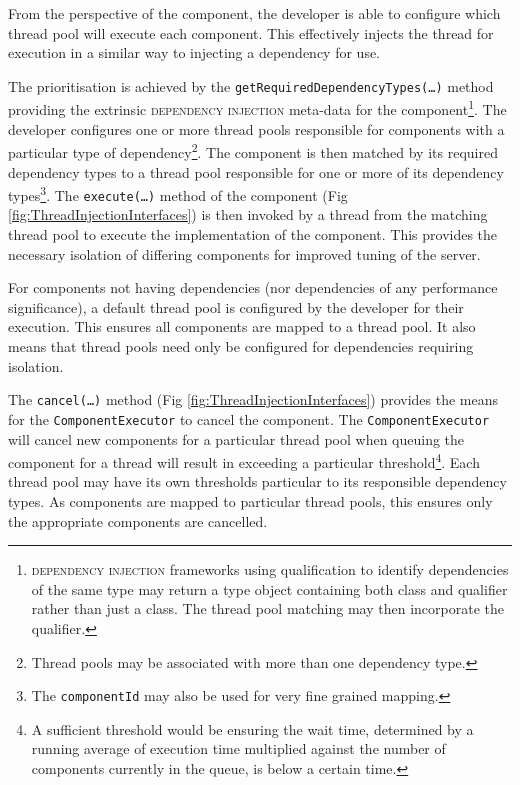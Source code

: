 \documentclass[prodmode]{style/acmlarge}
\begin{document}
From the perspective of the component, the developer is able to configure which
thread pool will execute each component.  This effectively injects the thread
for execution in a similar way to injecting a dependency for use.

The prioritisation is achieved by the
\texttt{getRequiredDependencyTypes(\ldots)} method providing the extrinsic
\textsc{dependency injection} \cite{ioc} meta-data for the
component\footnote{\textsc{dependency injection} frameworks using qualification to
identify dependencies of the same type may return a type object containing both
class and qualifier rather than just a class.  The thread pool matching may then
incorporate the qualifier.}.  The developer configures one or more thread pools
responsible for components with a particular type of dependency\footnote{Thread
pools may be associated with more than one dependency type.}.  The component is
then matched by its required dependency types to a thread pool responsible for
one or more of its dependency types\footnote{The \texttt{componentId} may also
be used for very fine grained mapping.}.  The \texttt{execute(\ldots)} method of
the component (Fig \ref{fig:ThreadInjectionInterfaces}) is then invoked by a thread
from the matching thread pool to execute the implementation of the component.
This provides the necessary isolation of differing components for improved tuning
of the server.

For components not having dependencies (nor dependencies of any
performance significance), a default thread pool is configured by the developer
for their execution.  This ensures all components are mapped to a
thread pool.  It also means that thread pools need only be configured for
dependencies requiring isolation.

The \texttt{cancel(\ldots)} method (Fig \ref{fig:ThreadInjectionInterfaces})
provides the means for the \texttt{ComponentExecutor} to cancel the component. 
The \texttt{ComponentExecutor} will cancel new components for a particular
thread pool when queuing the component for a thread will result in exceeding a
particular threshold\footnote{A sufficient threshold would be ensuring the wait
time, determined by a running average of execution time multiplied against the
number of components currently in the queue, is below a certain time.}.  Each
thread pool may have its own thresholds particular to its responsible dependency
types.  As components are mapped to particular thread pools, this ensures only
the appropriate components are cancelled.
\end{document}
